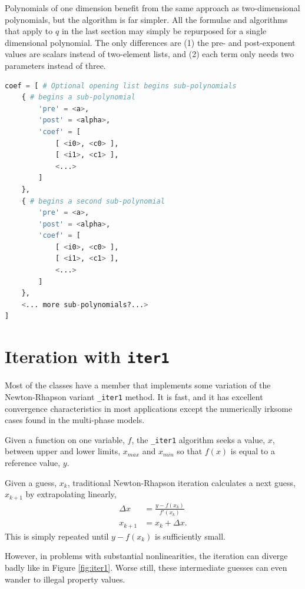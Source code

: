 Polynomials of one dimension benefit from the same approach as two-dimensional polynomials, but the algorithm is far simpler.  All the formulae and algorithms that apply to $q$ in the last section may simply be repurposed for a single dimensional polynomial.  The only differences are (1) the pre- and post-exponent values are scalars instead of two-element lists, and (2) each term only needs two parameters instead of three.

\begin{lstlisting}[language=Python]
coef = [ # Optional opening list begins sub-polynomials
    { # begins a sub-polynomial
        'pre' = <a>, 
        'post' = <alpha>,
        'coef' = [
            [ <i0>, <c0> ],
            [ <i1>, <c1> ],
            <...>
        ]
    },
    { # begins a second sub-polynomial
        'pre' = <a>, 
        'post' = <alpha>,
        'coef' = [
            [ <i0>, <c0> ],
            [ <i1>, <c1> ],
            <...>
        ]
    },
    <... more sub-polynomials?...>
]
\end{lstlisting}

\section{Iteration with \texttt{iter1}}\label{sec:num:iter1}

Most of the classes have a member that implements some variation of the Newton-Rhapson variant \verb|_iter1| method.  It is fast, and it has excellent convergence characteristics in most applications except the numerically irksome cases found in the multi-phase models.

Given a function on one variable, $f$, the \verb|_iter1| algorithm seeks a value, $x$, between upper and lower limits, $x_{max}$ and $x_{min}$ so that $f(x)$ is equal to a reference value, $y$.  

Given a guess, $x_k$, traditional Newton-Rhapson iteration calculates a next guess, $x_{k+1}$ by extrapolating linearly,
\begin{align}
\Delta x &= \frac{y-f(x_k)}{f'(x_k)}\\
x_{k+1} &= x_k + \Delta x.
\end{align}
This is simply repeated until $y-f(x_k)$ is sufficiently small.

However, in problems with substantial nonlinearities, the iteration can diverge badly like in Figure \ref{fig:iter1}.  Worse still, these intermediate guesses can even wander to illegal property values.

